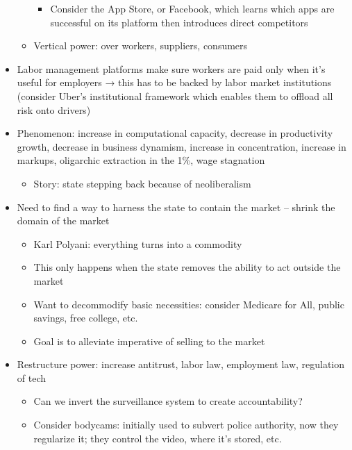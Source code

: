 \begin{itemize}
\begin{itemize}
    \begin{itemize}
    \tightlist
    \item
      Consider the App Store, or Facebook, which learns which apps are
      successful on its platform then introduces direct competitors
    \end{itemize}
  \item
    Vertical power: over workers, suppliers, consumers
  \end{itemize}
\item
  Labor management platforms make sure workers are paid only when it's
  useful for employers → this has to be backed by labor market
  institutions (consider Uber's institutional framework which enables
  them to offload all risk onto drivers)
\item
  Phenomenon: increase in computational capacity, decrease in
  productivity growth, decrease in business dynamism, increase in
  concentration, increase in markups, oligarchic extraction in the 1\%,
  wage stagnation

  \begin{itemize}
  \tightlist
  \item
    Story: state stepping back because of neoliberalism
  \end{itemize}
\item
  Need to find a way to harness the state to contain the market --
  shrink the domain of the market

  \begin{itemize}
  \tightlist
  \item
    Karl Polyani: everything turns into a commodity
  \item
    This only happens when the state removes the ability to act outside
    the market
  \item
    Want to decommodify basic necessities: consider Medicare for All,
    public savings, free college, etc.
  \item
    Goal is to alleviate imperative of selling to the market
  \end{itemize}
\item
  Restructure power: increase antitrust, labor law, employment law,
  regulation of tech

  \begin{itemize}
  \tightlist
  \item
    Can we invert the surveillance system to create accountability?
  \item
    Consider bodycams: initially used to subvert police authority, now
    they regularize it; they control the video, where it's stored, etc.


\end{itemize}
\end{itemize}
